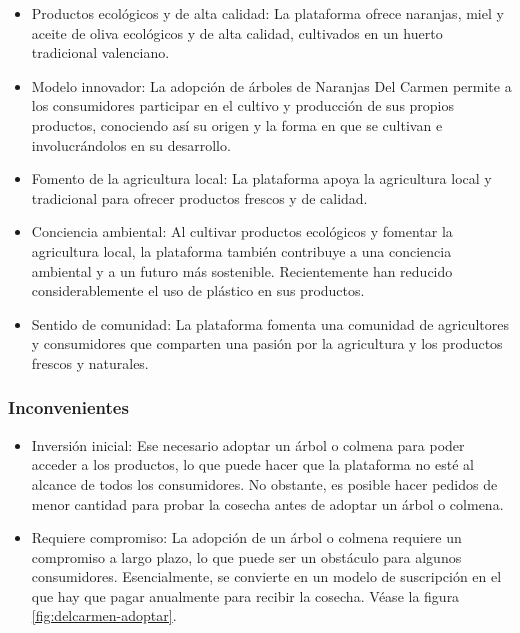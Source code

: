 \begin{itemize}

	\item Productos ecológicos y de alta calidad: La plataforma ofrece naranjas, miel y aceite de oliva ecológicos y de alta calidad, cultivados en un huerto tradicional valenciano.

	\item Modelo innovador: La adopción de árboles de Naranjas Del Carmen permite a los consumidores participar en el cultivo y producción de sus propios productos, conociendo así su origen y la forma en que se cultivan e involucrándolos en su desarrollo.

	\item Fomento de la agricultura local: La plataforma apoya la agricultura local y tradicional para ofrecer productos frescos y de calidad.

	\item Conciencia ambiental: Al cultivar productos ecológicos y fomentar la agricultura local, la plataforma también contribuye a una conciencia ambiental y a un futuro más sostenible. Recientemente han reducido considerablemente el uso de plástico en sus productos.

	\item Sentido de comunidad: La plataforma fomenta una comunidad de agricultores y consumidores que comparten una pasión por la agricultura y los productos frescos y naturales.

\end{itemize}

\subsubsection{Inconvenientes}

\begin{itemize}

	\item Inversión inicial: Ese necesario adoptar un árbol o colmena para poder acceder a los productos, lo que puede hacer que la plataforma no esté al alcance de todos los consumidores. No obstante, es posible hacer pedidos de menor cantidad para probar la cosecha antes de adoptar un árbol o colmena.

	\item Requiere compromiso: La adopción de un árbol o colmena requiere un compromiso a largo plazo, lo que puede ser un obstáculo para algunos consumidores. Esencialmente, se convierte en un modelo de suscripción en el que hay que pagar anualmente para recibir la cosecha. Véase la figura \ref{fig:delcarmen-adoptar}.

\end{itemize}

